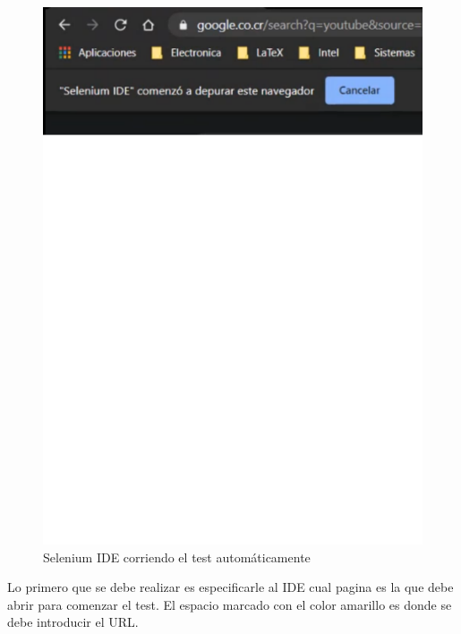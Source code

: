 \documentclass[conference]{IEEEtran}
\begin{document}
\begin{figure}[H]
\centering
\includegraphics[scale=0.47]{imagenes/20.pdf}
\caption{Selenium IDE corriendo el test automáticamente}
\end{figure}


Lo primero que se debe realizar es especificarle al IDE cual pagina es la que debe abrir para comenzar el test. El espacio marcado con el color amarillo es donde se debe introducir el URL.
\end{document}
